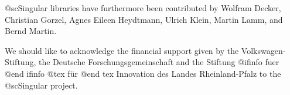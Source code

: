 @sc{Singular} libraries have furthermore been contributed by
Wolfram Decker,
Christian Gorzel,
Agnes Eileen Heydtmann,
Ulrich Klein,
Martin Lamm,
and
Bernd Martin.

We should like to acknowledge the financial support given by
the Volkswagen-Stiftung,
the Deutsche Forschungsgemeinschaft
and the Stiftung
@ifinfo
fuer
@end ifinfo
@tex
f\"ur
@end tex
Innovation des Landes Rheinland-Pfalz
to the
@sc{Singular} project.

